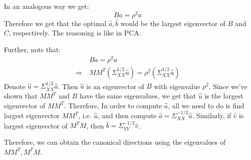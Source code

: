 \documentclass{article}
\begin{document}
In an analogous way we get:
\begin{equation*} 
  Ba = \rho ^2 a  
\end{equation*}
Therefore we get that the optimal $\hat{a}, \hat{b}$ would be the largest eigenvector of $B$ and $C$, respectively. The reasoning is like in PCA. 

Further, note that:
\begin{align} \label{eq:CCAOptSolB}
  & B \hat{a}  = \rho ^2 \hat{a}   \\
   \Rightarrow \ & MM^{T} (\Sigma_{XX}^{1/2} \hat{a} ) = \rho ^2 (\Sigma_{XX}^{1/2} \hat{a}  ) 
\end{align}
Denote $\hat{u} = \Sigma_{XX}^{1/2} \hat{a}$. Then $\hat{u}$ is an eigenvector of $B$ with eigenvalue $\rho ^2$. Since we've shown that $MM^{T}$ and $B$ have the same eigenvalues, we get that $\hat{u}$ is the largest eigenvector of $MM^{T}$. Therefore, In order to compute $\hat{a}$, all we need to do is find largest eigenvector $MM^{T}$, i.e. $\hat{u}$, and then compute $\hat{a} = \Sigma_{XX}^{-1/2} \hat{u}$. 
Similarly, if $\hat{v}$ is largest eigenvector of $M^{T}M$, then $\hat{b} = \Sigma_{YY}^{-1/2} \hat{v}$. 

Therefore, we can obtain the canonical directions using the eigenvalues of $MM^{T}, M^{T}M$. 
\end{document}
